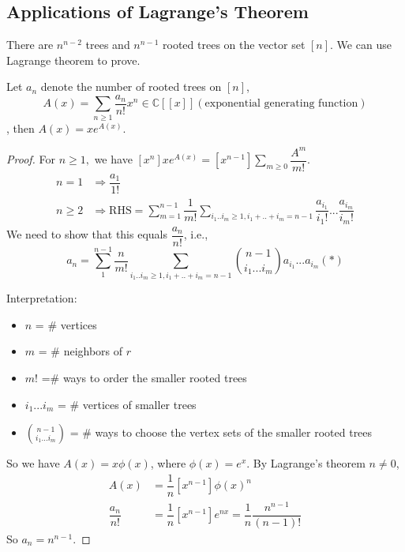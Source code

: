 \subsection{Applications of Lagrange's Theorem}
\begin{theorem}
There are $n^{n-2}$ trees and $n^{n-1}$ rooted trees on the vector set $[n]$. We can use Lagrange theorem to prove.
\end{theorem}

\begin{proposition}
Let $a_n$ denote the number of rooted trees on $[n]$, $$A(x)=\sum\limits_{n\geq 1} \dfrac{a_n}{n!}x^n \in \mathbb{C}[[x]] (\text{exponential generating function})$$, then $A(x)=xe^{A(x)}$.
\end{proposition}
\begin{proof}
For $n\geq 1,$ we have $[x^n]xe^{A(x)}=[x^{n-1}]\sum\limits_{m\geq 0}\dfrac{A^m}{m!}.$
\begin{align*}
n=1  &\Rightarrow \dfrac{a_1}{1!}\\
n\geq 2 &\Rightarrow \text{RHS}=\sum\limits_{m=1}^{n-1}\dfrac{1}{m!}\sum\limits_{i_1..i_m\geq 1, i_1+..+i_m=n-1} \dfrac{a_{i_1}}{i_1!} ...\dfrac{a_{i_m}}{i_m!}
\end{align*}
We need to show that this equals $\dfrac{a_n}{n!}$, i.e.,$$a_n=\sum\limits_1^{n-1}\dfrac{n}{m!}\sum\limits_{i_1..i_m\geq 1, i_1+..+i_m=n-1}{n-1 \choose i_1 ... i_m}a_{i_1}...a_{i_m}(*)$$

Interpretation:
\begin{itemize}
\item $n$ = \# vertices
\item $m$ = \# neighbors of $r$
\item $m!$ =\# ways to order the smaller rooted trees
\item $i_1...i_m$ = \# vertices of smaller trees
\item ${n-1 \choose i_1 ... i_m}$ = \# ways  to choose the vertex sets of the smaller rooted trees
\end{itemize}

So we have $A(x)=x\phi(x)$, where $\phi(x)=e^x$. By Lagrange's theorem $n\neq 0$,
\begin{align*}
[x^n]A(x)&=\dfrac{1}{n}[x^{n-1}]\phi(x)^n\\
\dfrac{a_n}{n!}&=\dfrac{1}{n}[x^{n-1}]e^{nx} =\dfrac{1}{n}\dfrac{n^{n-1}}{(n-1)!}
\end{align*}
So $a_n=n^{n-1}.$
\end{proof}

